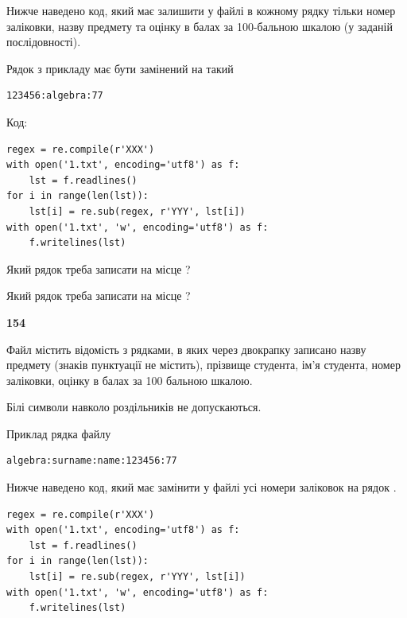 Нижче наведено код, який має залишити у файлі в кожному рядку тільки номер заліковки, назву предмету та оцінку в балах за 100-бальною шкалою (у заданій послі\-дов\-ності).

Рядок з прикладу має бути замінений на такий



\begin{verbatim}
123456:algebra:77
\end{verbatim}




Код:



\begin{verbatim}
regex = re.compile(r'XXX')
with open('1.txt', encoding='utf8') as f:
    lst = f.readlines()
for i in range(len(lst)):
    lst[i] = re.sub(regex, r'YYY', lst[i])
with open('1.txt', 'w', encoding='utf8') as f:
    f.writelines(lst)
\end{verbatim}







Який рядок треба записати на місце  ?\par
\vspace{5mm}


Який рядок треба записати на місце  ?\par


\newpage

{\begin {center}\textbf{ 154}\end {center}}\par
Файл  містить відомість з рядками, в яких через двокрапку записа\-но назву предмету (знаків пунктуації не містить), прізвище студента, ім'я студента, номер залі\-ков\-ки, оцінку в балах за 100 бальною шкалою.

Білі символи навколо роздільників не допускаються.

Приклад рядка файлу



\begin{verbatim}
algebra:surname:name:123456:77
\end{verbatim}


Нижче наведено код, який має замінити у файлі усі номери заліковок на рядок \code{***}.



\begin{verbatim}
regex = re.compile(r'XXX')
with open('1.txt', encoding='utf8') as f:
    lst = f.readlines()
for i in range(len(lst)):
    lst[i] = re.sub(regex, r'YYY', lst[i])
with open('1.txt', 'w', encoding='utf8') as f:
    f.writelines(lst)
\end{verbatim}







